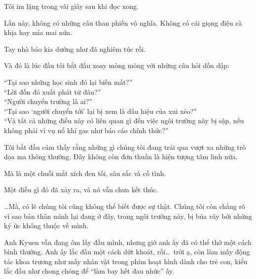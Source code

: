 \documentclass[../main.tex]{subfiles}
\begin{document}

Tôi im lặng trong vài giây sau khi đọc xong.

Lần này, không có những câu than phiền vô nghĩa. Không có cái giọng điệu cà khịa hay mỉa mai nữa.

Tay nhà báo kia dường như đã nghiêm túc rồi.

Và đó là lúc đầu tôi bắt đầu xoay mòng mòng với những câu hỏi dồn dập:
\begin{center}
  ``Tại sao những học sinh đó lại biến mất?''\\
  ``Lời đồn đó xuất phát từ đâu?''\\
  ``Người chuyển trường là ai?''\\
  ``Tại sao `người chuyển tới' lại bị xem là dấu hiệu của xui xẻo?''\\
  ``Và tất cả những điều này có liên quan gì đến việc ngôi trường này bị sập, nếu không phải vì vụ nổ khí gas như báo cáo chính thức?''\\
\end{center}

Tôi bắt đầu cảm thấy rằng những gì chúng tôi đang trải qua vượt xa những trò dọa ma thông thường. Đây không còn đơn thuần là hiện tượng tâm linh nữa.

Mà là một chuỗi mắt xích đen tối, sâu sắc và cố tình.

Một điều gì đó đã xảy ra, và nó vẫn chưa kết thúc.

\dots Mà, có lẽ chúng tôi cũng không thể biết được sự thật. Chúng tôi còn chẳng rõ vì sao bản thân mình lại đang ở đây, trong ngôi trường này, bị bủa vây bởi những ký ức không thuộc về mình.

Anh Kyuen vẫn đang ôm lấy đầu mình, nhưng giờ anh ấy đã có thể thở một cách bình thường. Anh ấy lắc đầu một cách dứt khoát, rồi\dots\ trời ạ, còn làm mấy động tác khoa trương như mấy nhân vật trong phim hoạt hình dành cho trẻ con, kiểu lắc đầu như chong chóng để ``làm bay hết đau nhức'' ấy.
\end{document}
